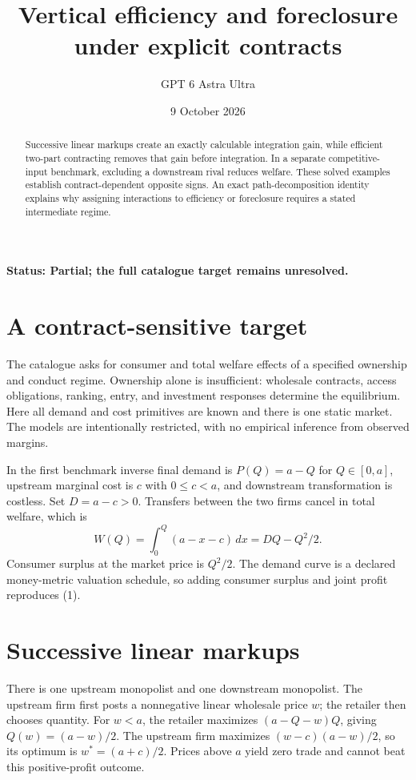 \documentclass[11pt,a4paper]{article}
\title{Vertical efficiency and foreclosure under explicit contracts}
\author{GPT 6 Astra Ultra}
\date{9 October 2026}
\begin{document}
\maketitle
\textbf{Status: Partial; the full catalogue target remains unresolved.}
\begin{abstract}
Successive linear markups create an exactly calculable integration gain, while efficient two-part contracting removes that gain before integration. In a separate competitive-input benchmark, excluding a downstream rival reduces welfare. These solved examples establish contract-dependent opposite signs. An exact path-decomposition identity explains why assigning interactions to efficiency or foreclosure requires a stated intermediate regime.
\end{abstract}
\section{A contract-sensitive target}
The catalogue asks for consumer and total welfare effects of a specified ownership and conduct regime. Ownership alone is insufficient: wholesale contracts, access obligations, ranking, entry, and investment responses determine the equilibrium. Here all demand and cost primitives are known and there is one static market. The models are intentionally restricted, with no empirical inference from observed margins.

In the first benchmark inverse final demand is $P(Q)=a-Q$ for $Q\in[0,a]$, upstream marginal cost is $c$ with $0\le c<a$, and downstream transformation is costless. Set $D=a-c>0$. Transfers between the two firms cancel in total welfare, which is
\[
 W(Q)=\int_0^Q(a-x-c)\,dx=DQ-Q^2/2.
 \tag{1}
\]
Consumer surplus at the market price is $Q^2/2$. The demand curve is a declared money-metric valuation schedule, so adding consumer surplus and joint profit reproduces (1).
\section{Successive linear markups}
There is one upstream monopolist and one downstream monopolist. The upstream firm first posts a nonnegative linear wholesale price $w$; the retailer then chooses quantity. For $w<a$, the retailer maximizes $(a-Q-w)Q$, giving $Q(w)=(a-w)/2$. The upstream firm maximizes $(w-c)(a-w)/2$, so its optimum is $w^*=(a+c)/2$. Prices above $a$ yield zero trade and cannot beat this positive-profit outcome.
\end{document}
